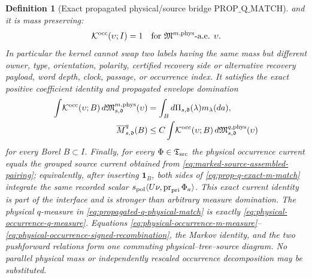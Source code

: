 \documentclass[11pt]{article}
\newtheorem{definition}[theorem]{Definition}
\newcommand{\one}{\mathbf 1}
\begin{document}
\begin{definition}[Exact propagated physical/source bridge
$\mathrm{PROP\_Q\_MATCH}$]
and it is mass preserving:
\begin{equation}
\label{eq:prop-q-occurrence-kernel-markov}
 \mathcal K^{\rm occ}(\upsilon;I)=1
 \quad\text{for }\mathfrak M^{m,\rm phys}\text{-a.e. }\upsilon.
\end{equation}
In particular the kernel cannot swap two labels having the same mass but
different owner, type, orientation, polarity, certified recovery side or
alternative recovery payload, word depth, clock, passage, or occurrence
index.  It satisfies the exact
positive coefficient identity
and propagated envelope domination
\begin{align}
 \int \!\mathcal K^{\rm occ}(\upsilon;B)
       \,d\mathfrak M_{s,\mathfrak d}^{m,\rm phys}(\upsilon)
 &=\int_Bd\Pi_{s,\mathfrak d}(\lambda)m_\lambda(da),
 \label{eq:prop-q-exact-m-match}\\
 \overline M_{s,\mathfrak d}^{q}(B)
 &\le C\int\!\mathcal K^{\rm occ}(\upsilon;B)
       \,d\mathfrak M_{s,\mathfrak d}^{q,\rm phys}(\upsilon)
 \label{eq:propagated-q-physical-match}
\end{align}
for every Borel $B\subset I$.  Finally, for every
$\Phi\in\mathfrak T_{\rm src}$ the physical occurrence current equals the
grouped source current obtained from
\eqref{eq:marked-source-assembled-pairing}; equivalently, after inserting
$\one_B$, both sides of \eqref{eq:prop-q-exact-m-match} integrate the same
recorded scalar
$s_{\rm pol}\langle U\nu,\operatorname{pr}_{\rm pri}\Phi_a\rangle$.  This exact current identity is part
of the interface and is stronger than arbitrary measure domination.
The physical $q$-measure in \eqref{eq:propagated-q-physical-match} is exactly
\eqref{eq:physical-occurrence-q-measure}.  Equations
\eqref{eq:physical-occurrence-m-measure}--
\eqref{eq:physical-occurrence-signed-recombination}, the Markov identity,
and the two pushforward relations form one commuting physical--tree--source
diagram.  No parallel physical mass or independently rescaled occurrence
decomposition may be substituted.
\end{definition}
\end{document}
